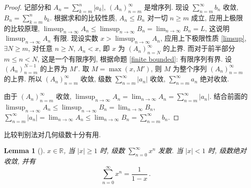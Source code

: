 \documentclass[UTF8]{ctexart}
\theoremstyle{mystyle}
\newtheorem{lemma}{Lemma}[section]
\theoremstyle{myremark}
\theoremstyle{plain}
\newcommand{\R}{\mathbb R}
\begin{document}
\begin{proof}
    记部分和 $ \displaystyle A_n = \sum_{k = m}^{n} |a_k| $, $ (A_n)_{n = m}^\infty $ 是增序列. 现设 $ \displaystyle \sum_{n = m}^{\infty} b_n $ 收敛, $ \displaystyle B_n = \sum_{k = m}^{n} b_k $. 根据求和的比较性质, $ A_n \leqslant B_n $ 对一切 $ n \geqslant m $ 成立, 应用上极限的比较原理, $ \displaystyle \limsup_{n \to \infty} A_n \leqslant \limsup_{n \to \infty} B_n = \lim_{n \to \infty} B_n = L $, 这说明 $ \displaystyle \limsup_{n \to \infty} A_n $ 有限. 现设实数 $ \displaystyle x > \limsup_{n \to \infty} A_n $, 应用上下极限性质 \ref{limsup}, $ \exists N \geqslant m $, 对任意 $ n \geqslant N $, $ \displaystyle A_n < x $, 即 $ x $ 为 $ (A_n)_{n = N}^\infty $ 的上界. 而对于前半部分 $ m \leqslant n < N $, 这是一个有限序列, 根据命题 \ref{finite bounded}: 有限序列有界. 设 $ (A_n)_{n = m}^{N - 1} $ 的上界为 $ M' $. 取 $ M = \max(x, M') $, 则 $ M $ 为整个序列 $ (A_n)_{n = m}^\infty $ 的上界. 所以 $ (A_n)_{n = m}^\infty $ 收敛, 级数 $ \displaystyle \sum_{n = m}^{\infty} |a_n| $ 收敛, $ \displaystyle \sum_{n = m}^{\infty} a_n $ 绝对收敛.

    由于 $ (A_n)_{n = m}^\infty $ 收敛, $ \displaystyle \limsup_{n \to \infty} A_n = \lim_{n \to \infty} A_n = \sum_{n = m}^{\infty} |a_n| $. 结合前面的 $ \displaystyle \limsup_{n \to \infty} A_n \leqslant \limsup_{n \to \infty} B_n = \lim_{n \to \infty} B_n $, $ \displaystyle \sum_{n = m}^{\infty} |a_n| = \lim_{n \to \infty} A_n \leqslant \lim_{n \to \infty} B_n = \sum_{n = m}^{\infty} b_n $.
\end{proof}

比较判别法对几何级数十分有用.

\begin{lemma}[]
    $ x \in \R $, 当 $ |x| \geqslant 1 $ 时, 级数 $ \displaystyle \sum_{n = 0}^{\infty} x^n $ 发散. 当 $ \displaystyle |x| < 1 $ 时, 级数绝对收敛, 并有 \[ \sum_{n = 0}^{\infty} x^n = \dfrac{1}{1 - x} \,.\]
\end{lemma}
\end{document}

